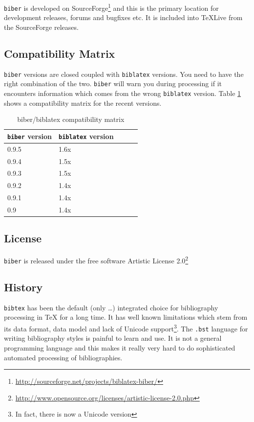 \documentclass{ltxdockit}
\begin{document}
\verb+biber+ is developed on
SourceForge\footnote{\url{http://sourceforge.net/projects/biblatex-biber/}}
and this is the primary location for development releases, forums and
bugfixes etc. It is included into TeXLive from the SourceForge releases.

\subsection{Compatibility Matrix}

\verb+biber+ versions are closed coupled with \verb+biblatex+ versions. You
need to have the right combination of the two. \verb+biber+ will warn you
during processing if it encounters information which comes from the wrong
\verb+biblatex+ version. Table \ref{tab:compat} shows a compatibility
matrix for the recent versions.

\begin{table}
\begin{center}
\small
\begin{tabular}{lllll}
\toprule
\verb+biber+ version & \verb+biblatex+ version\\
\midrule
0.9.5 & 1.6x\\
0.9.4 & 1.5x\\
0.9.3 & 1.5x\\
0.9.2 & 1.4x\\
0.9.1 & 1.4x\\
0.9 & 1.4x\\
\bottomrule
\end{tabular}
\end{center}
\caption{biber/biblatex compatibility matrix}
\label{tab:compat}
\end{table}

\subsection{License}

\verb+biber+ is released under the free software Artistic License 2.0\footnote{\url{http://www.opensource.org/licenses/artistic-license-2.0.php}}

\subsection{History}

\verb+bibtex+ has been the default (only \ldots) integrated choice for
bibliography processing in TeX for a long time. It has well known
limitations which stem from its data format, data model and lack of Unicode
support\footnote{In fact, there is now a Unicode version}. The
\verb+.bst+ language for writing bibliography styles is painful to learn
and use. It is not a general programming language and this makes it really
very hard to do sophisticated automated processing of bibliographies.
\end{document}
